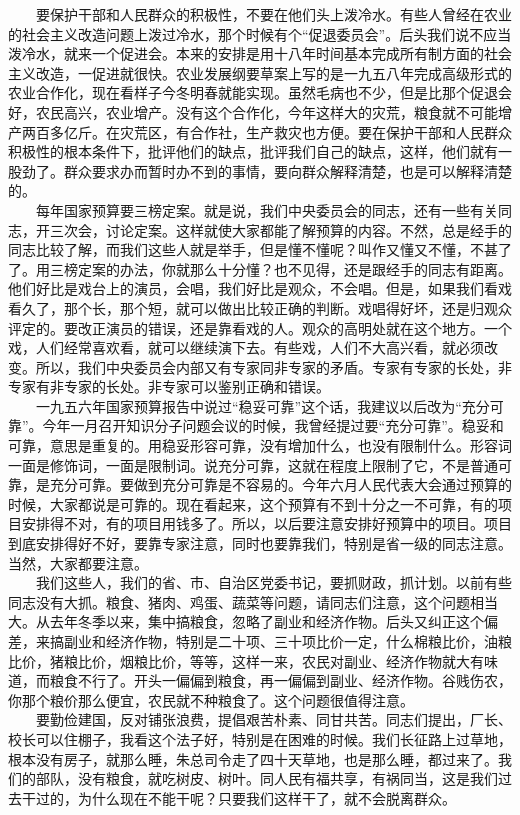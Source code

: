 \documentclass[cn,11pt,chinese]{elegantbook}
\begin{document}
　　要保护干部和人民群众的积极性，不要在他们头上泼冷水。有些人曾经在农业的社会主义改造问题上泼过冷水，那个时候有个“促退委员会”。后头我们说不应当泼冷水，就来一个促进会。本来的安排是用十八年时间基本完成所有制方面的社会主义改造，一促进就很快。农业发展纲要草案上写的是一九五八年完成高级形式的农业合作化，现在看样子今冬明春就能实现。虽然毛病也不少，但是比那个促退会好，农民高兴，农业增产。没有这个合作化，今年这样大的灾荒，粮食就不可能增产两百多亿斤。在灾荒区，有合作社，生产救灾也方便。要在保护干部和人民群众积极性的根本条件下，批评他们的缺点，批评我们自己的缺点，这样，他们就有一股劲了。群众要求办而暂时办不到的事情，要向群众解释清楚，也是可以解释清楚的。\\
　　每年国家预算要三榜定案。就是说，我们中央委员会的同志，还有一些有关同志，开三次会，讨论定案。这样就使大家都能了解预算的内容。不然，总是经手的同志比较了解，而我们这些人就是举手，但是懂不懂呢？叫作又懂又不懂，不甚了了。用三榜定案的办法，你就那么十分懂？也不见得，还是跟经手的同志有距离。他们好比是戏台上的演员，会唱，我们好比是观众，不会唱。但是，如果我们看戏看久了，那个长，那个短，就可以做出比较正确的判断。戏唱得好坏，还是归观众评定的。要改正演员的错误，还是靠看戏的人。观众的高明处就在这个地方。一个戏，人们经常喜欢看，就可以继续演下去。有些戏，人们不大高兴看，就必须改变。所以，我们中央委员会内部又有专家同非专家的矛盾。专家有专家的长处，非专家有非专家的长处。非专家可以鉴别正确和错误。\\
　　一九五六年国家预算报告中说过“稳妥可靠”这个话，我建议以后改为“充分可靠”。今年一月召开知识分子问题会议的时候，我曾经提过要“充分可靠”。稳妥和可靠，意思是重复的。用稳妥形容可靠，没有增加什么，也没有限制什么。形容词一面是修饰词，一面是限制词。说充分可靠，这就在程度上限制了它，不是普通可靠，是充分可靠。要做到充分可靠是不容易的。今年六月人民代表大会通过预算的时候，大家都说是可靠的。现在看起来，这个预算有不到十分之一不可靠，有的项目安排得不对，有的项目用钱多了。所以，以后要注意安排好预算中的项目。项目到底安排得好不好，要靠专家注意，同时也要靠我们，特别是省一级的同志注意。当然，大家都要注意。\\
　　我们这些人，我们的省、市、自治区党委书记，要抓财政，抓计划。以前有些同志没有大抓。粮食、猪肉、鸡蛋、蔬菜等问题，请同志们注意，这个问题相当大。从去年冬季以来，集中搞粮食，忽略了副业和经济作物。后头又纠正这个偏差，来搞副业和经济作物，特别是二十项、三十项比价一定，什么棉粮比价，油粮比价，猪粮比价，烟粮比价，等等，这样一来，农民对副业、经济作物就大有味道，而粮食不行了。开头一偏偏到粮食，再一偏偏到副业、经济作物。谷贱伤农，你那个粮价那么便宜，农民就不种粮食了。这个问题很值得注意。\\
　　要勤俭建国，反对铺张浪费，提倡艰苦朴素、同甘共苦。同志们提出，厂长、校长可以住棚子，我看这个法子好，特别是在困难的时候。我们长征路上过草地，根本没有房子，就那么睡，朱总司令走了四十天草地，也是那么睡，都过来了。我们的部队，没有粮食，就吃树皮、树叶。同人民有福共享，有祸同当，这是我们过去干过的，为什么现在不能干呢？只要我们这样干了，就不会脱离群众。\\
\end{document}
